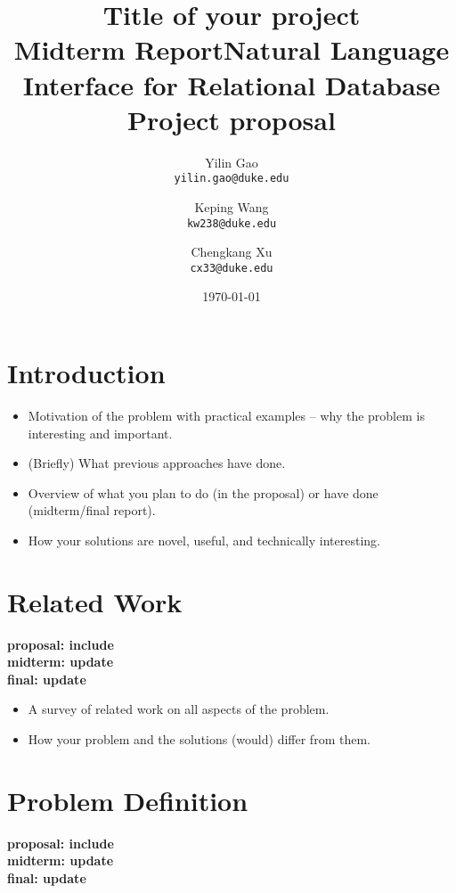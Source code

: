 \documentclass[twocolumn]{article}
\newcommand{\red}[1]{{\bf \color{red}#1}}
\newcommand{\blue}[1]{{\bf \color{blue}#1}}
\begin{document}
\title{Title of your project\\
\small{Midterm Report}}

\title{Natural Language Interface for Relational Database\\
	\small{Project proposal}}

\author{Yilin Gao \\
	\small \texttt{yilin.gao@duke.edu} \and 
	Keping Wang \\
	\small \texttt{kw238@duke.edu} \and 
	Chengkang Xu \\
	\small \texttt{cx33@duke.edu} }
	
\date{\today}
\maketitle

\section{Introduction}\label{sec:introduction}

\red{
\begin{itemize}
\itemsep0em
\item Motivation of the problem with practical examples -- why the problem is interesting and important.
\item (Briefly) What previous approaches have done.
\item Overview of what you plan to do (in the proposal) or have done (midterm/final report).
\item How your solutions are novel, useful, and technically interesting.
\end{itemize}
}

\section{Related Work}
\blue{
proposal: include\\
midterm: update\\
final: update\\
}

\red{
\begin{itemize}
\itemsep0em
\item A survey of related work on all aspects of the problem.
\item How your problem and the solutions (would) differ from them.
\end{itemize}
}

\section{Problem Definition}
\blue{
proposal: include\\
midterm: update\\
final: update\\
}
\end{document}
